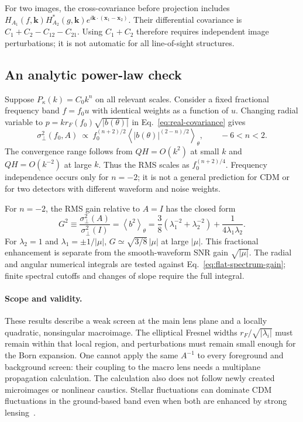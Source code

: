 For two images, the cross-covariance before projection includes
$H_{A_1}(f,\boldsymbol{k})H_{A_2}^*(g,\boldsymbol{k})
e^{i\boldsymbol{k}\cdot(\boldsymbol{x}_1-\boldsymbol{x}_2)}$.
Their differential covariance is $C_1+C_2-C_{12}-C_{21}$.
Using $C_1+C_2$ therefore requires independent image perturbations;
it is not automatic for all line-of-sight structures.

\subsection{An analytic power-law check}

Suppose $P_\kappa(k)=C_0 k^n$ on all relevant scales.  Consider a fixed
fractional frequency band $f=f_0 u$ with identical weights as a function
of $u$.  Changing radial variable to
$p=k r_F(f_0)\sqrt{|b(\theta)|}$ in
Eq.~\eqref{eq:real-covariance} gives
\begin{equation}
 \sigma_\perp^2(f_0,A)\ \propto\
 f_0^{(n+2)/2}
 \left\langle |b(\theta)|^{(2-n)/2}\right\rangle_\theta,
 \qquad -6<n<2.
 \label{eq:powerlaw-scaling}
\end{equation}
The convergence range follows from $QH=O(k^2)$ at small $k$ and
$QH=O(k^{-2})$ at large $k$.  Thus the RMS scales as
$f_0^{(n+2)/4}$.  Frequency independence occurs only for $n=-2$;
it is not a general prediction for CDM or for two detectors with
different waveform and noise weights.

For $n=-2$, the RMS gain relative to $A=I$ has the closed form
\begin{equation}
 G^2\equiv\frac{\sigma_\perp^2(A)}{\sigma_\perp^2(I)}
 =\left\langle b^2\right\rangle_\theta
 =\frac{3}{8}\left(\lambda_1^{-2}+\lambda_2^{-2}\right)
   +\frac{1}{4\lambda_1\lambda_2}.
 \label{eq:flat-spectrum-gain}
\end{equation}
For $\lambda_2=1$ and $\lambda_1=\pm1/|\mu|$,
$G\simeq\sqrt{3/8}\,|\mu|$ at large $|\mu|$.
This fractional enhancement is separate from the smooth-waveform SNR
gain $\sqrt{|\mu|}$.  The radial and angular numerical integrals are
tested against Eq.~\eqref{eq:flat-spectrum-gain}; finite spectral cutoffs
and changes of slope require the full integral.

\paragraph{Scope and validity.}
These results describe a weak screen at the main lens plane and a
locally quadratic, nonsingular macroimage.  The elliptical Fresnel
widths $r_F/\sqrt{|\lambda_i|}$ must remain within that local region,
and perturbations must remain small enough for the Born expansion.
One cannot apply the same $A^{-1}$ to every foreground and background
screen: their coupling to the macro lens needs a multiplane propagation
calculation.  The calculation also does not follow newly created
microimages or nonlinear caustics.  Stellar fluctuations can dominate
CDM fluctuations in the ground-based band even when both are enhanced
by strong lensing~\cite{oguri2022}.
